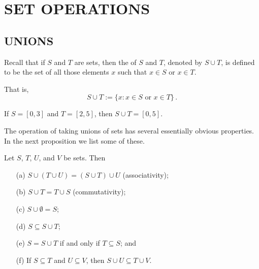 \chapter{SET OPERATIONS}


\section{UNIONS}
Recall that if $S$ and $T$ are sets, then the
 of $S$ and $T$, denoted by $S \cup T$, is defined to be the set of all those
elements $x$ such that $x \in S$ or $x \in T$.

That is,
   \[ S \cup T  :=  \{x \colon x \in S \text{ or } x \in T\}\,. \]

\begin{exam} If $S = [0,3]$ and $T = [2,5]$, then $S \cup T = [0,5]$.
\end{exam}

The operation of taking unions of sets has several essentially obvious properties.  In the
next proposition we list some of these.

\begin{prop}\label{prop_union_sets} Let $S$, $T$, $U$, and $V$ be sets.  Then
 \begin{enumerate}
   \item[(a)] $S \cup (T \cup U) = (S \cup T) \cup U$ \qquad (associativity);
   \item[(b)] $S \cup T = T \cup S$ \qquad (commutativity);
   \item[(c)] $S \cup \emptyset = S$;
   \item[(d)] $S \subseteq S \cup T$;
   \item[(e)] $S = S \cup T$ if and only if $T \subseteq S$; and
   \item[(f)] If $S \subseteq T$ and $U \subseteq V$, then $S \cup U \subseteq T \cup V$.
 \end{enumerate}
\end{prop}

